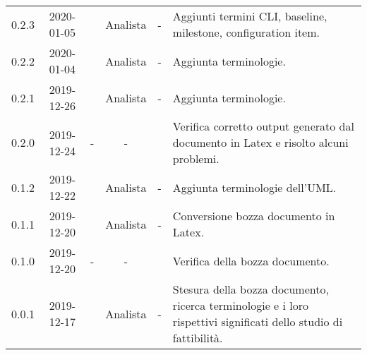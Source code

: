 {\begin{longtable}{ c c  C{2.5cm} c c C{3.5cm}}
0.2.3 & 2020-01-05 & \AT{} & Analista & - & Aggiunti termini CLI, baseline, milestone, configuration item. \\

0.2.2 & 2020-01-04 & \MC{} & Analista & - & Aggiunta terminologie. \\

0.2.1 & 2019-12-26 & \MC{} & Analista & - & Aggiunta terminologie. \\

0.2.0 & 2019-12-24 & - & - & \DF{} & Verifica corretto output generato dal documento in Latex e risolto alcuni problemi. \\

0.1.2 & 2019-12-22 & \CE{} & Analista & - & Aggiunta terminologie dell'UML. \\

0.1.1 & 2019-12-20 & \MC{} & Analista & - & Conversione bozza documento in Latex. \\
		
0.1.0 & 2019-12-20 & - & - & \DF{} & Verifica della bozza documento. \\
		
0.0.1 & 2019-12-17 & \MC{} & Analista & - & Stesura della bozza documento, ricerca terminologie e i loro rispettivi significati dello studio di fattibilità. \\
		
\end{longtable}
}